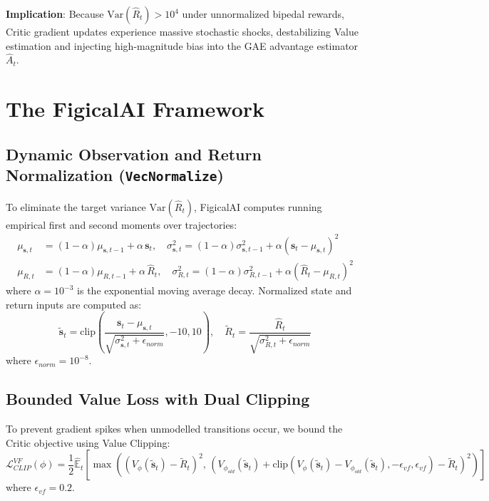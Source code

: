 \documentclass{article}
\begin{document}
\textbf{Implication}: Because $\text{Var}(\hat{R}_t) > 10^4$ under unnormalized bipedal rewards, Critic gradient updates experience massive stochastic shocks, destabilizing Value estimation and injecting high-magnitude bias into the GAE advantage estimator $\hat{A}_t$.

\section{The FigicalAI Framework}
\label{sec:methodology}

\subsection{Dynamic Observation and Return Normalization (\texttt{VecNormalize})}
To eliminate the target variance $\text{Var}(\hat{R}_t)$, FigicalAI computes running empirical first and second moments over trajectories:
\begin{align}
\mu_{\mathbf{s}, t} &= (1 - \alpha) \mu_{\mathbf{s}, t-1} + \alpha \, \mathbf{s}_t, \quad \sigma_{\mathbf{s}, t}^2 = (1 - \alpha) \sigma_{\mathbf{s}, t-1}^2 + \alpha (\mathbf{s}_t - \mu_{\mathbf{s}, t})^2 \\
\mu_{R, t} &= (1 - \alpha) \mu_{R, t-1} + \alpha \, \hat{R}_t, \quad \sigma_{R, t}^2 = (1 - \alpha) \sigma_{R, t-1}^2 + \alpha (\hat{R}_t - \mu_{R, t})^2
\end{align}
where $\alpha = 10^{-3}$ is the exponential moving average decay. Normalized state and return inputs are computed as:
\begin{equation}
\tilde{\mathbf{s}}_t = \text{clip}\left( \frac{\mathbf{s}_t - \mu_{\mathbf{s}, t}}{\sqrt{\sigma_{\mathbf{s}, t}^2 + \epsilon_{norm}}}, -10, 10 \right), \quad \tilde{R}_t = \frac{\hat{R}_t}{\sqrt{\sigma_{R, t}^2 + \epsilon_{norm}}}
\end{equation}
where $\epsilon_{norm} = 10^{-8}$.

\subsection{Bounded Value Loss with Dual Clipping}
To prevent gradient spikes when unmodelled transitions occur, we bound the Critic objective using Value Clipping:
\begin{equation}
\label{eq:vf_clipped}
\mathcal{L}^{VF}_{CLIP}(\phi) = \frac{1}{2} \hat{\mathbb{E}}_t \left[ \max \left( (V_\phi(\tilde{\mathbf{s}}_t) - \tilde{R}_t)^2, \, \left( V_{\phi_{old}}(\tilde{\mathbf{s}}_t) + \text{clip}(V_\phi(\tilde{\mathbf{s}}_t) - V_{\phi_{old}}(\tilde{\mathbf{s}}_t), -\epsilon_{vf}, \epsilon_{vf}) - \tilde{R}_t \right)^2 \right) \right]
\end{equation}
where $\epsilon_{vf} = 0.2$.
\end{document}
